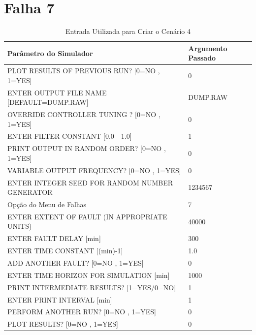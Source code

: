 \documentclass[journal]{IEEEtran}
\begin{document}
\clearpage
\section*{Falha 7}

\begin{table}[H]
	\centering
	\normalsize
	\begin{tabular}{|l|l|}
		\hline
		Parâmetro do Simulador								& Argumento Passado \\
		\hline\hline
		PLOT RESULTS OF PREVIOUS RUN? [0=NO , 1=YES] 		& 0 				\\ \hline
		ENTER OUTPUT FILE NAME [DEFAULT=DUMP.RAW] 			& DUMP.RAW	\\ \hline
		OVERRIDE CONTROLLER TUNING ? [0=NO , 1=YES] 		& 0 				\\ \hline
		ENTER FILTER CONSTANT [0.0 - 1.0]					& 1 				\\ \hline
		PRINT OUTPUT IN RANDOM ORDER? [0=NO , 1=YES]		& 0 				\\ \hline
		VARIABLE OUTPUT FREQUENCY? [0=NO , 1=YES]			& 0 				\\ \hline
		ENTER INTEGER SEED FOR RANDOM NUMBER GENERATOR		& 1234567		\\ \hline
		Opção do Menu de Falhas		 						& 7 				\\ \hline
		ENTER EXTENT OF FAULT (IN APPROPRIATE UNITS) 		& 40000				\\ \hline
		ENTER FAULT DELAY [min]								& 300				\\ \hline
		ENTER TIME CONSTANT [(min)-1]						& 1.0				\\ \hline
		ADD ANOTHER FAULT? [0=NO , 1=YES]					& 0 				\\ \hline
		ENTER TIME HORIZON FOR SIMULATION [min]  			& 1000			\\ \hline
		PRINT INTERMEDIATE RESULTS? [1=YES/0=NO] 			& 1 				\\ \hline
		ENTER PRINT INTERVAL [min]						  	& 1 				\\ \hline
		PERFORM ANOTHER RUN? [0=NO , 1=YES] 	  			& 0 				\\ \hline
		PLOT RESULTS? [0=NO , 1=YES] 					  	& 0 				\\ \hline
	\end{tabular}
	\caption{Entrada Utilizada para Criar o Cenário 4}
\end{table}
\end{document}
